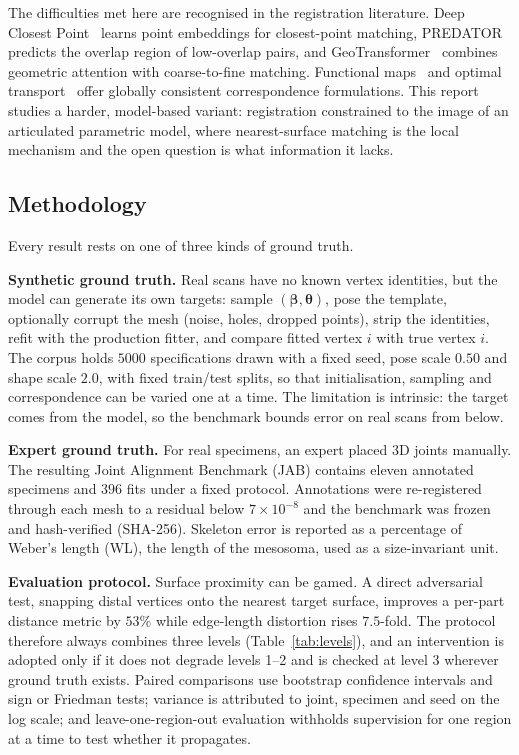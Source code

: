 The difficulties met here are recognised in the registration literature.
Deep Closest Point~\cite{dcp} learns point embeddings for closest-point
matching, PREDATOR~\cite{predator} predicts the overlap region of low-overlap
pairs, and GeoTransformer~\cite{geotransformer} combines geometric attention
with coarse-to-fine matching. Functional maps~\cite{fmaps} and optimal
transport~\cite{ot} offer globally consistent correspondence formulations.
This report studies a harder, model-based variant: registration constrained to
the image of an articulated parametric model, where nearest-surface matching is
the local mechanism and the open question is what information it lacks.

\subsection{Methodology}
\label{sec:method}

Every result rests on one of three kinds of ground truth.

\textbf{Synthetic ground truth.} Real scans have no known vertex identities,
but the model can generate its own targets: sample $(\bm\beta,\bm\theta)$,
pose the template, optionally corrupt the mesh (noise, holes, dropped points),
strip the identities, refit with the production fitter, and compare fitted
vertex $i$ with true vertex $i$. The corpus holds $5000$ specifications drawn
with a fixed seed, pose scale $0.50$ and shape scale $2.0$, with fixed
train/test splits, so that initialisation, sampling and correspondence can be
varied one at a time. The limitation is intrinsic: the target comes from the
model, so the benchmark bounds error on real scans from below.

\textbf{Expert ground truth.} For real specimens, an expert placed 3D joints
manually. The resulting Joint Alignment Benchmark (JAB) contains eleven
annotated specimens and $396$ fits under a fixed protocol. Annotations were
re-registered through each mesh to a residual below $7\times10^{-8}$ and the
benchmark was frozen and hash-verified (SHA-256). Skeleton error is reported as
a percentage of Weber's length (WL), the length of the mesosoma, used as a
size-invariant unit.

\textbf{Evaluation protocol.} Surface proximity can be gamed. A direct
adversarial test, snapping distal vertices onto the nearest target surface,
improves a per-part distance metric by $53\%$ while edge-length distortion
rises $7.5$-fold. The protocol therefore always combines three levels
(Table~\ref{tab:levels}), and an intervention is adopted only if it does not
degrade levels 1--2 and is checked at level 3 wherever ground truth exists.
Paired comparisons use bootstrap confidence intervals and sign or Friedman
tests; variance is attributed to joint, specimen and seed on the log scale; and
leave-one-region-out evaluation withholds supervision for one region at a time
to test whether it propagates.


